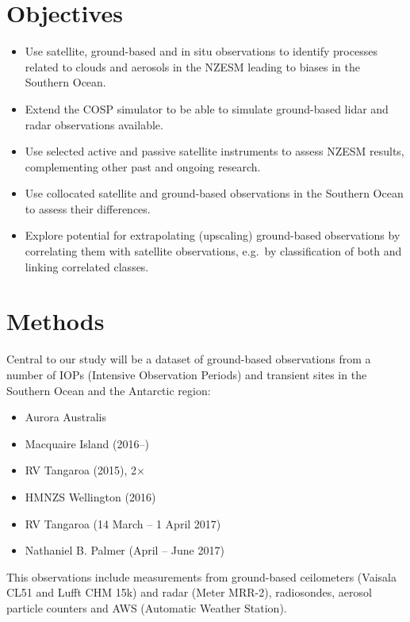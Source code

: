 \section{Objectives}\label{objectives}

\begin{itemize}
\item
  Use satellite, ground-based and in situ observations to identify
  processes related to clouds and aerosols in the NZESM leading to
  biases in the Southern Ocean.
\item
  Extend the COSP simulator to be able to simulate ground-based lidar
  and radar observations available.
\item
  Use selected active and passive satellite instruments to assess NZESM
  results, complementing other past and ongoing research.
\item
  Use collocated satellite and ground-based observations in the Southern
  Ocean to assess their differences.
\item
  Explore potential for extrapolating (upscaling) ground-based
  observations by correlating them with satellite observations, e.g.~by
  classification of both and linking correlated classes.
\end{itemize}

\section{Methods}\label{methods}

Central to our study will be a dataset of ground-based observations from
a number of IOPs (Intensive Observation Periods) and transient sites in
the Southern Ocean and the Antarctic region:

\begin{itemize}
\itemsep1pt\parskip0pt
\item
  Aurora Australis
\item
  Macquaire Island (2016--)
\item
  RV Tangaroa (2015), 2×
\item
  HMNZS Wellington (2016)
\item
  RV Tangaroa (14 March -- 1 April 2017)
\item
  Nathaniel B. Palmer (April -- June 2017)
\end{itemize}

This observations include measurements from ground-based ceilometers
(Vaisala CL51 and Lufft CHM 15k) and radar (Meter MRR-2), radiosondes,
aerosol particle counters and AWS (Automatic Weather Station).

